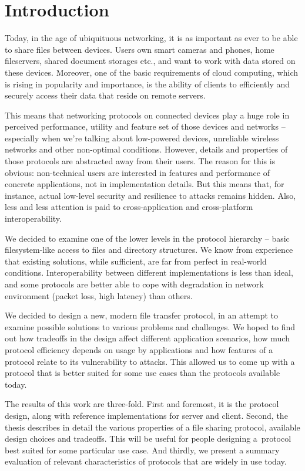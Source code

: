 \chapter*{Introduction}

Today, in the age of ubiquituous networking, it is as important as ever to be able to share files between
devices. Users own smart cameras and phones, home fileservers, shared document storages etc., and want to
work with data stored on these devices. Moreover, one of the basic requirements of cloud computing, which is
rising in popularity and importance, is the ability of clients to efficiently and securely access their data
that reside on remote servers.

This means that networking protocols on connected devices play a huge role in perceived performance, utility
and feature set of those devices and networks -- especially when we're talking about low-powered devices,
unreliable wireless networks and other non-optimal conditions. However, details and properties of those
protocols are abstracted away from their users. The reason for this is obvious: non-technical users are
interested in features and performance of concrete applications, not in implementation details. But this means
that, for instance, actual low-level security and resilience to attacks remains hidden. Also, less and less
attention is paid to cross-application and cross-platform interoperability.

We decided to examine one of the lower levels in the protocol hierarchy -- basic filesystem-like access to
files and directory structures. We know from experience that existing solutions, while sufficient, are
far from perfect in real-world conditions. Interoperability between different implementations is less than ideal,
and some protocols are better able to cope with degradation in network environment (packet loss, high latency)
than others.

We decided to design a new, modern file transfer protocol, in an attempt to examine possible solutions to
various problems and challenges. We hoped to find out how tradeoffs in the design affect different application
scenarios, how much protocol efficiency depends on usage by applications and how features of a protocol relate
to its vulnerability to attacks. This allowed us to come up with a protocol that is better suited for some
use cases than the protocols available today.

The results of this work are three-fold. First and foremost, it is the protocol design, along with reference
implementations for server and client. Second, the thesis describes in detail the various properties of a file
sharing protocol, available design choices and tradeoffs.  This will be useful for people designing a~protocol
best suited for some particular use case. And thirdly, we present a summary evaluation of relevant
characteristics of protocols that are widely in use today.

